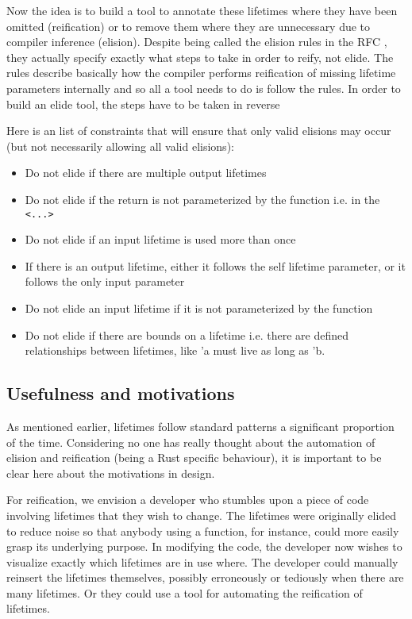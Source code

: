 Now the idea is to build a tool to annotate these lifetimes where they have been omitted (reification) or to remove them where they are unnecessary due to compiler inference (elision). Despite being called the elision rules in the RFC \cite{elisionrules}, they actually specify exactly what steps to take in order to reify, not elide. The rules describe basically how the compiler performs reification of missing lifetime parameters internally and so all a tool needs to do is follow the rules. In order to build an elide tool, the steps have to be taken in reverse 


Here is an list of constraints that will ensure that only valid elisions may occur (but not necessarily allowing all valid elisions):
\begin{itemize}
\item Do not elide if there are multiple output lifetimes
\item Do not elide if the return is not parameterized by the function i.e. in the {\verb|<...>|}
\item Do not elide if an input lifetime is used more than once
\item If there is an output lifetime, either it follows the self lifetime parameter, or it follows the only input parameter
\item Do not elide an input lifetime if it is not parameterized by the function
\item Do not elide if there are bounds on a lifetime i.e. there are defined relationships between lifetimes, like 'a must live as long as 'b.
\end{itemize}

\subsection{Usefulness and motivations}
As mentioned earlier, lifetimes follow standard patterns a significant proportion of the time. Considering no one has really thought about the automation of elision and reification (being a Rust specific behaviour), it is important to be clear here about the motivations in design. 

For reification, we envision a developer who stumbles upon a piece of code involving lifetimes that they wish to change. The lifetimes were originally elided to reduce noise so that anybody using a function, for instance, could more easily grasp its underlying purpose. In modifying the code, the developer now wishes to visualize exactly which lifetimes are in use where. The developer could manually reinsert the lifetimes themselves, possibly erroneously or tediously when there are many lifetimes. Or they could use a tool for automating the reification of lifetimes.

